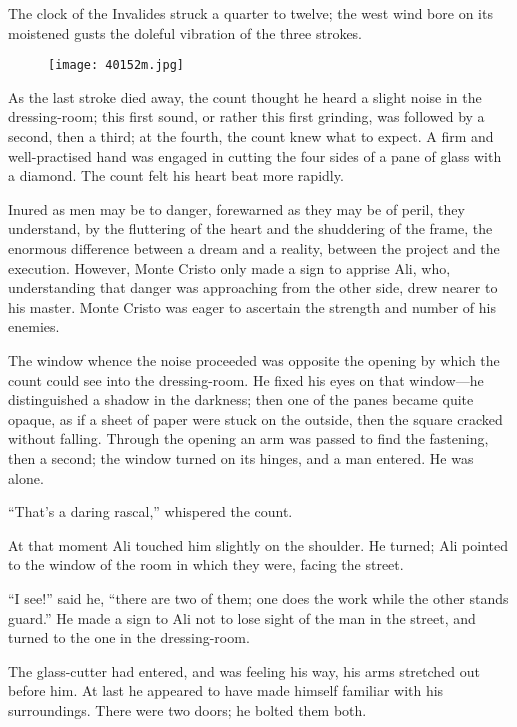 The clock of the Invalides struck a quarter to twelve; the west wind
bore on its moistened gusts the doleful vibration of the three strokes.

\begin{figure}[ht]
\texttt{[image: 40152m.jpg]}
\end{figure}

As the last stroke died away, the count thought he heard a slight noise
in the dressing-room; this first sound, or rather this first grinding,
was followed by a second, then a third; at the fourth, the count knew
what to expect. A firm and well-practised hand was engaged in cutting
the four sides of a pane of glass with a diamond. The count felt his
heart beat more rapidly.

Inured as men may be to danger, forewarned as they may be of peril,
they understand, by the fluttering of the heart and the shuddering of
the frame, the enormous difference between a dream and a reality,
between the project and the execution. However, Monte Cristo only made
a sign to apprise Ali, who, understanding that danger was approaching
from the other side, drew nearer to his master. Monte Cristo was eager
to ascertain the strength and number of his enemies.

The window whence the noise proceeded was opposite the opening by which
the count could see into the dressing-room. He fixed his eyes on that
window—he distinguished a shadow in the darkness; then one of the panes
became quite opaque, as if a sheet of paper were stuck on the outside,
then the square cracked without falling. Through the opening an arm was
passed to find the fastening, then a second; the window turned on its
hinges, and a man entered. He was alone.

“That’s a daring rascal,” whispered the count.

At that moment Ali touched him slightly on the shoulder. He turned; Ali
pointed to the window of the room in which they were, facing the
street.

“I see!” said he, “there are two of them; one does the work while the
other stands guard.” He made a sign to Ali not to lose sight of the man
in the street, and turned to the one in the dressing-room.

The glass-cutter had entered, and was feeling his way, his arms
stretched out before him. At last he appeared to have made himself
familiar with his surroundings. There were two doors; he bolted them
both.

